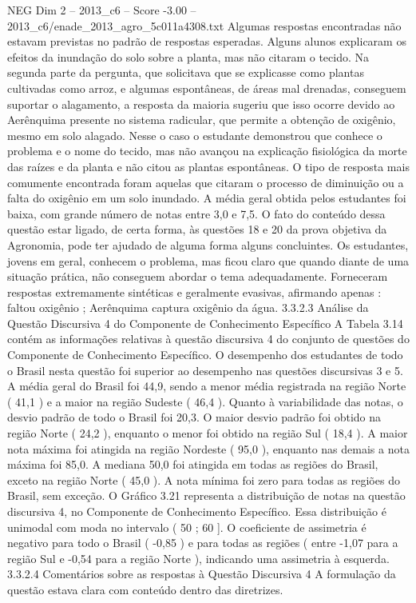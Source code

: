 \begin{textsample}{NEG Dim 2 – 2013\_c6 – Score -3.00 – 2013\_c6/enade\_2013\_agro\_5c011a4308.txt}
Algumas respostas encontradas não estavam previstas no padrão de respostas esperadas.
Alguns alunos explicaram os efeitos da inundação do solo sobre a planta, mas não citaram o tecido.
Na segunda parte da pergunta, que solicitava que se explicasse como plantas cultivadas como arroz, e algumas espontâneas, de áreas mal drenadas, conseguem suportar o alagamento, a resposta da maioria sugeriu que isso ocorre devido ao Aerênquima presente no sistema radicular, que permite a obtenção de oxigênio, mesmo em solo alagado.
Nesse o caso o estudante demonstrou que conhece o problema e o nome do tecido, mas não avançou na explicação fisiológica da morte das raízes e da planta e não citou as plantas espontâneas.
O tipo de resposta mais comumente encontrada foram aquelas que citaram o processo de diminuição ou a falta do oxigênio em um solo inundado.
A média geral obtida pelos estudantes foi baixa, com grande número de notas entre 3,0 e 7,5.
O fato do conteúdo dessa questão estar ligado, de certa forma, às questões 18 e 20 da prova objetiva da Agronomia, pode ter ajudado de alguma forma alguns concluintes.
Os estudantes, jovens em geral, conhecem o problema, mas ficou claro que quando diante de uma situação prática, não conseguem abordar o tema adequadamente.
Forneceram respostas extremamente sintéticas e geralmente evasivas, afirmando apenas : faltou oxigênio ; Aerênquima captura oxigênio da água. 3.3.2.3 Análise da Questão Discursiva 4 do Componente de Conhecimento Específico A Tabela 3.14 contém as informações relativas à questão discursiva 4 do conjunto de questões do Componente de Conhecimento Específico.
O desempenho dos estudantes de todo o Brasil nesta questão foi superior ao desempenho nas questões discursivas 3 e 5.
A média geral do Brasil foi 44,9, sendo a menor média registrada na região Norte ( 41,1 ) e a maior na região Sudeste ( 46,4 ).
Quanto à variabilidade das notas, o desvio padrão de todo o Brasil foi 20,3.
O maior desvio padrão foi obtido na região Norte ( 24,2 ), enquanto o menor foi obtido na região Sul ( 18,4 ).
A maior nota máxima foi atingida na região Nordeste ( 95,0 ), enquanto nas demais a nota máxima foi 85,0.
A mediana 50,0 foi atingida em todas as regiões do Brasil, exceto na região Norte ( 45,0 ).
A nota mínima foi zero para todas as regiões do Brasil, sem exceção.
O Gráfico 3.21 representa a distribuição de notas na questão discursiva 4, no Componente de Conhecimento Específico.
Essa distribuição é unimodal com moda no intervalo ( 50 ; 60 ].
O coeficiente de assimetria é negativo para todo o Brasil ( -0,85 ) e para todas as regiões ( entre -1,07 para a região Sul e -0,54 para a região Norte ), indicando uma assimetria à esquerda. 3.3.2.4 Comentários sobre as respostas à Questão Discursiva 4 A formulação da questão estava clara com conteúdo dentro das diretrizes.

\end{textsample}
